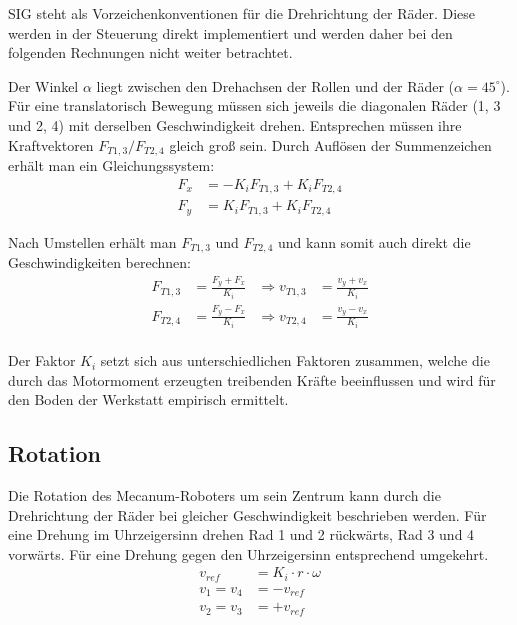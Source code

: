 \documentclass[a4paper]{article}
\begin{document}
SIG steht als Vorzeichenkonventionen für die Drehrichtung der Räder. Diese werden in der Steuerung direkt implementiert und werden daher bei den folgenden Rechnungen nicht weiter betrachtet.

Der Winkel $ \alpha $ liegt zwischen den Drehachsen der Rollen und der Räder ($\alpha = 45^\circ$).
Für eine translatorisch Bewegung müssen sich jeweils die diagonalen Räder (1, 3 und 2, 4) mit derselben Geschwindigkeit drehen. Entsprechen müssen ihre Kraftvektoren $F_{T1, 3} / F_{T2, 4}$ gleich groß sein.
Durch Auflösen der Summenzeichen erhält man ein Gleichungssystem:
\begin{align*}
    F_x &= - K_i F_{T1, 3} + K_i F_{T2, 4} \\
    F_y &= K_i F_{T1, 3}   + K_i F_{T2, 4}
\end{align*}

Nach Umstellen erhält man $F_{T1, 3}$ und $F_{T2, 4}$ und kann somit auch direkt die Geschwindigkeiten berechnen:
\begin{align*}
    F_{T1, 3} &= \frac{F_y + F_x}{K_i} &\Rightarrow v_{T1, 3} &= \frac{v_y + v_x}{K_i} \\
    F_{T2, 4} &= \frac{F_y - F_x}{K_i} &\Rightarrow v_{T2, 4} &= \frac{v_y - v_x}{K_i} \\
\end{align*}

Der Faktor $K_i$ setzt sich aus unterschiedlichen Faktoren zusammen, welche die durch das Motormoment erzeugten treibenden Kräfte beeinflussen und wird für den Boden der Werkstatt empirisch ermittelt.


\subsection{Rotation}
Die Rotation des Mecanum-Roboters um sein Zentrum kann durch die Drehrichtung der Räder bei gleicher Geschwindigkeit beschrieben werden.
Für eine Drehung im Uhrzeigersinn drehen Rad 1 und 2 rückwärts, Rad 3 und 4 vorwärts. Für eine Drehung gegen den Uhrzeigersinn entsprechend umgekehrt.
\begin{align*}
    v_{ref} &= K_i \cdot r \cdot \omega \\
    v_1 = v_4 &= - v_{ref}              \\
    v_2 = v_3 &= + v_{ref}
\end{align*}
\end{document}
